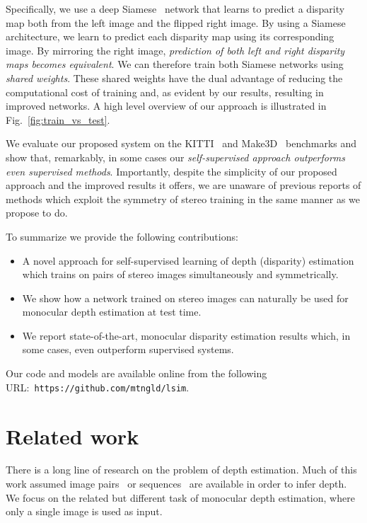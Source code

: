 \documentclass[10pt,twocolumn,letterpaper]{article}
\begin{document}
Specifically, we use a deep Siamese~\cite{bromley1994signature} network that learns to predict a disparity map both from the left image and the flipped right image. By using a Siamese architecture, we learn to predict each disparity map using its corresponding image. By mirroring the right image, {\em prediction of both left and right disparity maps becomes equivalent}. We can therefore train both Siamese networks using {\em shared weights}. These shared weights have the dual advantage of reducing the computational cost of training and, as evident by our results, resulting in improved networks. A high level overview of our approach is illustrated in Fig.~\ref{fig:train_vs_test}.

We evaluate our proposed system on the KITTI~\cite{Geiger2012AreSuite} and Make3D~\cite{saxena2006learning} benchmarks and show that, remarkably, in some cases our {\em self-supervised approach outperforms even supervised methods}. Importantly, despite the simplicity of our proposed approach and the improved results it offers, we are unaware of previous reports of methods which exploit the symmetry of stereo training in the same manner as we propose to do.

To summarize we provide the following contributions:
\begin{itemize}
	\item A novel approach for self-supervised learning of depth (disparity) estimation which trains on pairs of stereo images simultaneously and symmetrically.
	\item We show how a network trained on stereo images can naturally be used for monocular depth estimation at test time.
	\item We report state-of-the-art, monocular disparity estimation results which, in some cases, even outperform supervised systems.
\end{itemize}

Our code and models are available online from the following URL:~\texttt{https://github.com/mtngld/lsim}.


\section{Related work}
There is a long line of research on the problem of depth estimation. Much of this work assumed image pairs~\cite{scharstein2002taxonomy} or sequences~\cite{karsch2012depth} are available in order to infer depth. We focus on the related but different task of monocular depth estimation, where only a single image is used as input.
\end{document}
